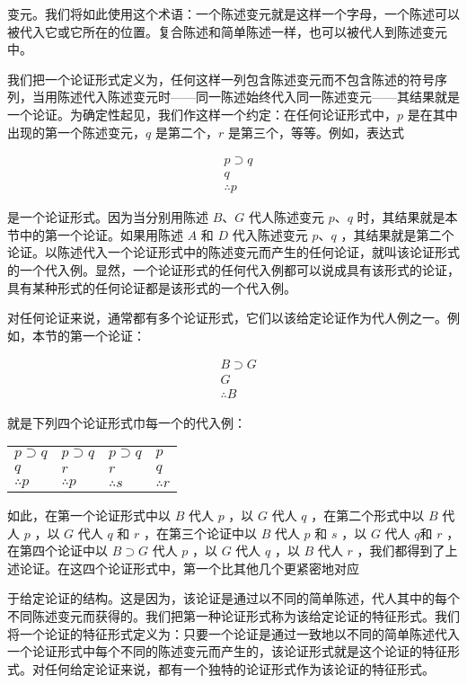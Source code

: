 变元。我们将如此使用这个术语：一个陈述变元就是这样一个字母，一个陈述可以被代入它或它所在的位置。复合陈述和简单陈述一样，也可以被代人到陈述变元中。

我们把一个论证形式定义为，任何这样一列包含陈述变元而不包含陈述的符号序列，当用陈述代入陈述变元时——同一陈述始终代入同一陈述变元——其结果就是一个论证。为确定性起见，我们作这样一个约定：在任何论证形式中，$p$ 是在其中出现的第一个陈述变元，$q$ 是第二个，$r$ 是第三个，等等。例如，表达式

$$
\begin{aligned}
& p \supset q \\
& q \\
& \therefore p
\end{aligned}
$$

是一个论证形式。因为当分别用陈述 $B 、 G$ 代人陈述变元 $p 、 q$ 时，其结果就是本节中的第一个论证。如果用陈述 $A$ 和 $D$ 代入陈述变元 $p 、 q$ ，其结果就是第二个论证。以陈述代入一个论证形式中的陈述变元而产生的任何论证，就叫该论证形式的一个代入例。显然，一个论证形式的任何代入例都可以说成具有该形式的论证，具有某种形式的任何论证都是该形式的一个代入例。

对任何论证来说，通常都有多个论证形式，它们以该给定论证作为代人例之一。例如，本节的第一个论证：

$$
\begin{aligned}
& B \supset G \\
& G \\
& \therefore B
\end{aligned}
$$

就是下列四个论证形式巾每一个的代入例：

\begin{center}
\begin{tabular}{llll}
$p \supset q$ & $p \supset q$ & $p \supset q$ & $p$ \\
$q$ & $r$ & $r$ & $q$ \\
$\therefore p$ & $\therefore p$ & $\therefore s$ & $\therefore r$ \\
\end{tabular}
\end{center}

如此，在第一个论证形式中以 $B$ 代人 $p$ ，以 $G$ 代人 $q$ ，在第二个形式中以 $B$ 代人 $p$ ，以 $G$ 代人 $q$ 和 $r$ ，在第三个论证中以 $B$ 代人 $p$ 和 $s$ ，以 $G$ 代人 $q$和 $r$ ，在第四个论证中以 $B \supset G$ 代人 $p$ ，以 $G$ 代人 $q$ ，以 $B$ 代人 $r$ ，我们都得到了上述论证。在这四个论证形式中，第一个比其他几个更紧密地对应

于给定论证的结构。这是因为，该论证是通过以不同的简单陈述，代人其中的每个不同陈述变元而获得的。我们把第一种论证形式称为该给定论证的特征形式。我们将一个论证的特征形式定义为：只要一个论证是通过一致地以不同的简单陈述代入一个论证形式中每个不同的陈述变元而产生的，该论证形式就是这个论证的特征形式。对任何给定论证来说，都有一个独特的论证形式作为该论证的特征形式。

